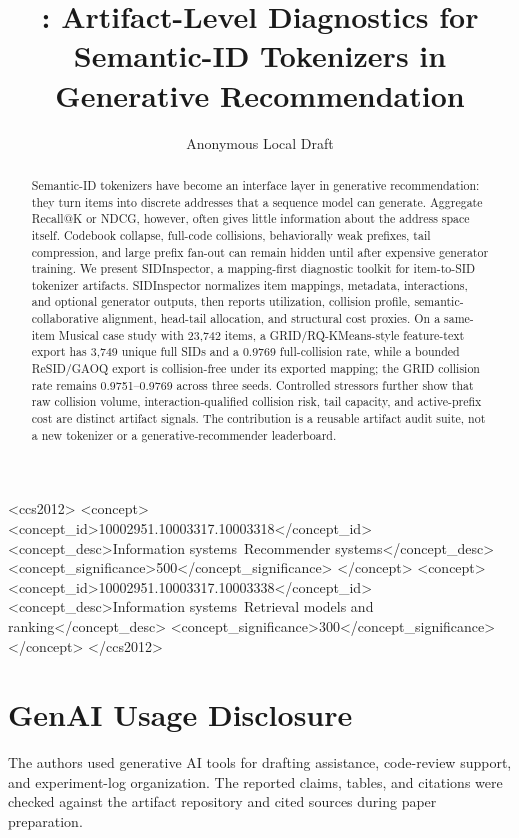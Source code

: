 \documentclass[sigconf,natbib=true,anonymous=true]{acmart}
\title{\tool: Artifact-Level Diagnostics for Semantic-ID Tokenizers in Generative Recommendation}
\author{Anonymous Local Draft}
\affiliation{%
  \institution{Anonymous Institution}
  \country{}
}
\newcommand{\tool}{SIDInspector\xspace}
\newcommand{\sid}{SID\xspace}
\begin{document}
\begin{CCSXML}
<ccs2012>
 <concept>
  <concept_id>10002951.10003317.10003318</concept_id>
  <concept_desc>Information systems~Recommender systems</concept_desc>
  <concept_significance>500</concept_significance>
 </concept>
 <concept>
  <concept_id>10002951.10003317.10003338</concept_id>
  <concept_desc>Information systems~Retrieval models and ranking</concept_desc>
  <concept_significance>300</concept_significance>
 </concept>
</ccs2012>
\end{CCSXML}


\begin{abstract}
Semantic-ID tokenizers have become an interface layer in generative
recommendation: they turn items into discrete addresses that a sequence model
can generate. Aggregate Recall@K or NDCG, however, often gives little
information about the address space itself. Codebook collapse, full-code
collisions, behaviorally weak prefixes, tail compression, and large prefix
fan-out can remain hidden until after expensive generator training. We present
\tool, a mapping-first diagnostic toolkit for item-to-\sid tokenizer artifacts.
\tool normalizes item mappings, metadata, interactions, and optional generator
outputs, then reports utilization, collision profile, semantic-collaborative
alignment, head-tail allocation, and structural cost proxies. On a same-item
Musical case study with 23,742 items, a GRID/RQ-KMeans-style feature-text
export has 3,749 unique full \sid{}s and a 0.9769 full-collision rate, while a
bounded ReSID/GAOQ export is collision-free under its exported mapping; the
GRID collision rate remains 0.9751--0.9769 across three seeds. Controlled
stressors further show that raw collision volume, interaction-qualified
collision risk, tail capacity, and active-prefix cost are distinct artifact
signals. The contribution is a reusable artifact audit suite, not a new
tokenizer or a generative-recommender leaderboard.
\end{abstract}

\maketitle







\section*{GenAI Usage Disclosure}
The authors used generative AI tools for drafting assistance, code-review
support, and experiment-log organization. The reported claims, tables, and
citations were checked against the artifact repository and cited sources during
paper preparation.



\end{document}
